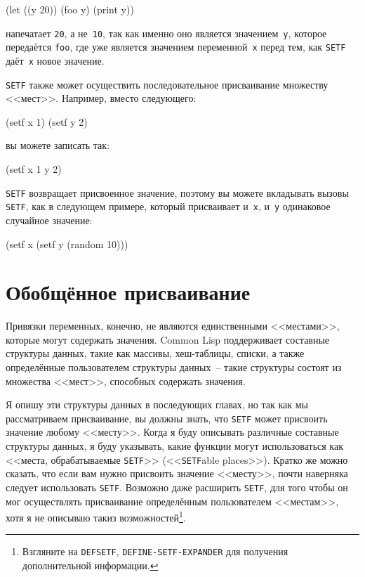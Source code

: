 \begin{myverb}
(let ((y 20))
  (foo y)
  (print y))
\end{myverb}

\noindent{}напечатает \lstinline{20}, а не~\lstinline{10}, так как именно оно является значением~\lstinline{y}, которое передаётся
\lstinline{foo}, где уже является значением переменной~\lstinline{x} перед тем, как \lstinline{SETF}
даёт~\lstinline{x} новое значение.

\lstinline{SETF} также может осуществить последовательное присваивание множеству
<<мест>>. Например, вместо следующего:

\begin{myverb}
(setf x 1)
(setf y 2)
\end{myverb}

\noindent{}вы можете записать так:

\begin{myverb}
(setf x 1 y 2)
\end{myverb}

\lstinline{SETF} возвращает присвоенное значение, поэтому вы можете вкладывать вызовы
\lstinline{SETF}, как в следующем примере, который присваивает и~\lstinline{x}, и~\lstinline{y} одинаковое случайное
значение:

\begin{myverb}
(setf x (setf y (random 10)))
\end{myverb}

\section{Обобщённое присваивание}

Привязки переменных, конечно, не являются единственными <<местами>>, которые могут содержать
значения. Common Lisp поддерживает составные структуры данных, такие как массивы,
хеш-таблицы, списки, а также определённые пользователем структуры данных~-- такие
структуры состоят из множества <<мест>>, способных содержать значения.

Я опишу эти структуры данных в последующих главах, но так как мы рассматриваем
присваивание, вы должны знать, что \lstinline{SETF} может присвоить значение любому
<<месту>>. Когда я буду описывать различные составные структуры данных, я буду указывать,
какие функции могут использоваться как <<места, обрабатываемые \lstinline{SETF}>>
(<<\lstinline{SETF}able places>>). Кратко же можно сказать, что если вам нужно присвоить
значение <<месту>>, почти наверняка следует использовать \lstinline{SETF}. Возможно даже
расширить \lstinline{SETF}, для того чтобы он мог осуществлять присваивание определённым
пользователем <<местам>>, хотя я не описываю такиз возможностей\footnote{Взгляните на
  \lstinline{DEFSETF}, \lstinline{DEFINE-SETF-EXPANDER} для получения дополнительной
  информации.}\hspace{\footnotenegspace}.


